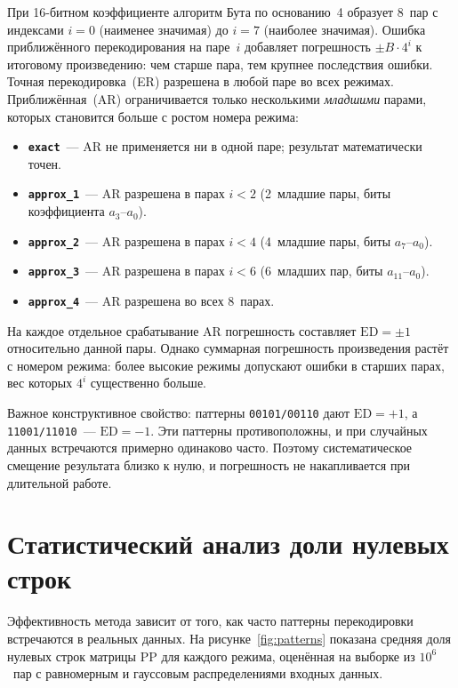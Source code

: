 \documentclass[a4paper, 12pt, oneside]{report}
\begin{document}
При 16-битном коэффициенте алгоритм Бута по основанию~4 образует 8~пар с
индексами $i = 0$ (наименее значимая) до $i = 7$ (наиболее значимая).
Ошибка приближённого перекодирования на паре~$i$ добавляет погрешность
$\pm B\cdot 4^i$ к итоговому произведению: чем старше пара, тем
крупнее последствия ошибки. Точная перекодировка~(ER) разрешена в любой
паре во всех режимах. Приближённая~(AR) ограничивается только несколькими
\textit{младшими} парами, которых становится больше с ростом номера режима:

\begin{itemize}
  \item \textbf{\texttt{exact}}~--- AR не применяется ни в одной паре;
        результат математически точен.
  \item \textbf{\texttt{approx\_1}}~--- AR разрешена в парах $i < 2$
        (2~младшие пары, биты коэффициента $a_3$--$a_0$).
  \item \textbf{\texttt{approx\_2}}~--- AR разрешена в парах $i < 4$
        (4~младшие пары, биты $a_7$--$a_0$).
  \item \textbf{\texttt{approx\_3}}~--- AR разрешена в парах $i < 6$
        (6~младших пар, биты $a_{11}$--$a_0$).
  \item \textbf{\texttt{approx\_4}}~--- AR разрешена во всех 8~парах.
\end{itemize}

На каждое отдельное срабатывание AR погрешность составляет $\mathrm{ED} = \pm 1$
относительно данной пары. Однако суммарная погрешность произведения растёт
с номером режима: более высокие режимы допускают ошибки в старших парах,
вес которых $4^i$ существенно больше.

Важное конструктивное свойство: паттерны \texttt{00101/00110} дают
$\mathrm{ED} = +1$, а \texttt{11001/11010}~--- $\mathrm{ED} = -1$. Эти
паттерны противоположны, и при случайных данных встречаются примерно
одинаково часто. Поэтому систематическое смещение результата близко к
нулю, и погрешность не накапливается при длительной работе.

\section{Статистический анализ доли нулевых строк}

Эффективность метода зависит от того, как часто паттерны
перекодировки встречаются в реальных данных. На рисунке~\ref{fig:patterns}
показана средняя доля нулевых строк матрицы PP для каждого режима,
оценённая на выборке из $10^6$~пар с равномерным и гауссовым
распределениями входных данных.
\end{document}
